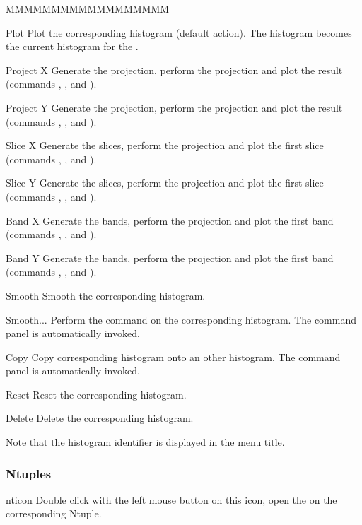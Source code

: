 \begin{DLsf}{MMMMMMMMMMMMMMMMMM}
\item[Plot]         Plot the corresponding histogram (default action). The
                    histogram becomes the current histogram for the \HSP.
\item[Project X]    Generate the  projection, perform the projection
                    and plot the result (commands , ,
                    and ).
\item[Project Y]    Generate the  projection, perform the projection
                    and plot the result (commands , ,
                    and ).
\item[Slice X]      Generate the  slices, perform the projection
                    and plot the first slice (commands ,
                    , and ).
\item[Slice Y]      Generate the  slices, perform the projection
                    and plot the first slice (commands ,
                    , and ).
\item[Band X]       Generate the  bands, perform the projection
                    and plot the first band (commands ,
                    , and ).
\item[Band Y]       Generate the  bands, perform the projection
                    and plot the first band (commands ,
                    , and ).
\item[Smooth]       Smooth the corresponding histogram.
\item[Smooth...]    Perform the command  on the corresponding
                    histogram. The command panel is automatically invoked.
\item[Copy ]        Copy corresponding histogram onto an other histogram.
                    The command panel is automatically invoked.
\item[Reset ]       Reset the corresponding histogram.
\item[Delete]       Delete the corresponding histogram.
\end{DLsf}

Note that the histogram identifier is displayed in the menu title.


\subsubsection{Ntuples}
\begin{ICON}{nticon}
Double click with the left mouse button on this icon, open the \NV{} on the
corresponding Ntuple.
\end{ICON}

